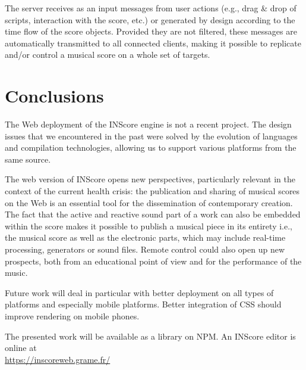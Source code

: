 \documentclass{article}
\begin{document}
The server receives as an input messages from user actions (e.g., drag \& drop of scripts, interaction with the score, etc.) or generated by design according to the time flow of the score objects. Provided they are not filtered, these messages are automatically transmitted to all connected clients, making it possible to replicate and/or control a musical score on a whole set of targets.


\section{Conclusions}

The Web deployment of the INScore engine is not a recent project. The design issues that we encountered in the past were solved by the evolution of languages and compilation technologies, allowing us to support various platforms from the same source.

The web version of INScore opens new perspectives, particularly relevant in the context of the current health crisis: the publication and sharing of musical scores on the Web is an essential tool for the dissemination of contemporary creation. 
The fact that the active and reactive sound part of a work can also be embedded within the score makes it possible to publish a musical piece in its entirety i.e., the musical score as well as the electronic parts, which may include real-time processing, generators or sound files. Remote control could also open up new prospects, both from an educational point of view and for the performance of the music.

Future work will deal in particular with better deployment on all types of platforms and especially mobile platforms. Better integration of CSS should improve rendering on mobile phones.

The presented work will be available as a library on NPM. An INScore editor is online at \\
\hspace*{15mm} {\small \url{https://inscoreweb.grame.fr/}}



\balance

\end{document}
